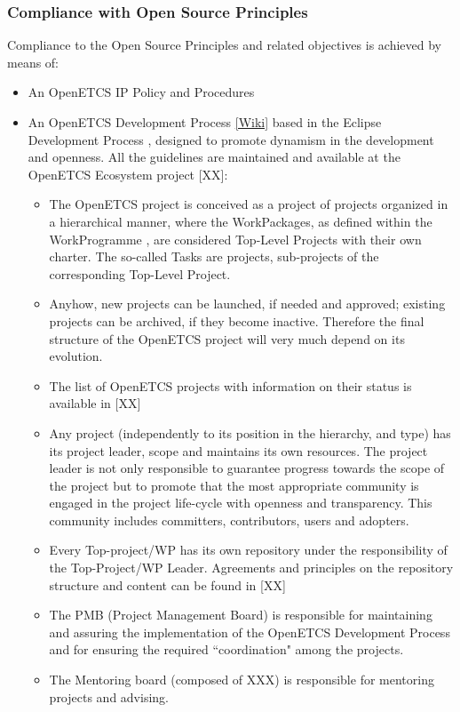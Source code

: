 \documentclass{template/openetcs_article}
\begin{document}
\subsubsection{Compliance with Open Source Principles}
Compliance to the Open Source Principles and related objectives is achieved by means of:
\begin{itemize}
\item An OpenETCS IP Policy and Procedures \citep{IPP}
\item An OpenETCS Development Process \citep{odp} \href{https://github.com/openETCS/ecosystem/wiki/openETCS-Development-Process}{[Wiki]} based in the Eclipse Development Process \citep{EDP}, designed to promote dynamism in the development and openness. All the guidelines are maintained and available at the OpenETCS Ecosystem project [XX]: 
\begin{itemize}
\item The OpenETCS project is conceived as a project of projects organized in a hierarchical manner, where the WorkPackages, as defined within the WorkProgramme \citep{fpp}, are considered Top-Level Projects with their own charter. The so-called Tasks are projects, sub-projects of the corresponding Top-Level Project.
\item Anyhow, new projects can be launched, if needed and approved; existing projects can be archived, if they become inactive. Therefore the final structure of the OpenETCS project will very much depend on its evolution.  
\item The list of OpenETCS projects with information on their status is available in [XX]
\item Any project (independently to its position in the hierarchy, and type) has its project leader, scope and maintains its own resources. The project leader is not only responsible to guarantee progress towards the scope of the project but to promote that the most appropriate community is engaged in the project life-cycle with openness and transparency. This community includes committers, contributors, users and adopters.
\item Every Top-project/WP has its own repository under the responsibility of the Top-Project/WP Leader. Agreements and principles on the repository structure and content can be found in [XX] 
\item The PMB (Project Management Board) is responsible for maintaining and assuring the implementation of the OpenETCS Development Process and for ensuring the required “coordination" among the projects.
\item The Mentoring board (composed of XXX) is responsible for mentoring projects and advising.

\end{itemize}
\end{itemize}
\end{document}
